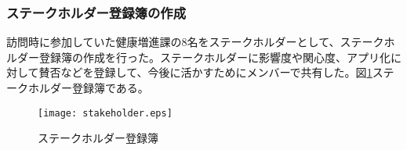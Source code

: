 ﻿\subsubsection{ステークホルダー登録簿の作成}
 訪問時に参加していた健康増進課の8名をステークホルダーとして、ステークホルダー登録簿の作成を行った。ステークホルダーに影響度や関心度、アプリ化に対して賛否などを登録して、今後に活かすためにメンバーで共有した。図\ref{fig:addsh}ステークホルダー登録簿である。

\begin{figure}[htbp]
\centering
\texttt{[image: stakeholder.eps]}
\caption{ステークホルダー登録簿}
\label{fig:addsh}
\end{figure}

